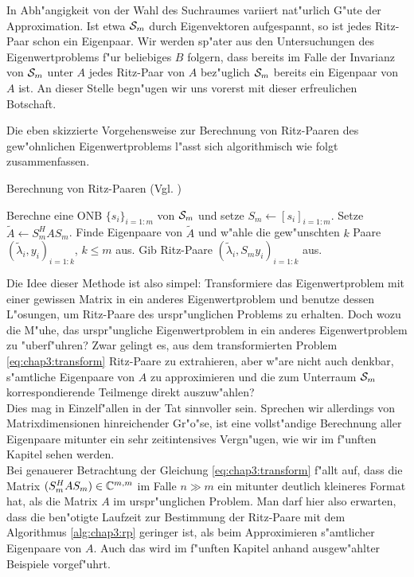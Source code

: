 In Abh"angigkeit von der Wahl
des Suchraumes variiert nat"urlich G"ute der Approximation. Ist etwa $\S_m$
durch Eigenvektoren aufgespannt, so ist jedes Ritz-Paar schon ein Eigenpaar.
Wir werden sp"ater aus den Untersuchungen des Eigenwertproblems f"ur beliebiges $B$ folgern,
dass bereits im Falle der Invarianz von $\S_m$ unter $A$ jedes Ritz-Paar von $A$ bez"uglich $\S_m$ bereits ein Eigenpaar von $A$ ist.
An dieser Stelle begn"ugen wir uns vorerst mit dieser erfreulichen Botschaft.

\newpage

Die eben skizzierte Vorgehensweise zur Berechnung von Ritz-Paaren des gew"ohnlichen Eigenwertproblems
l"asst sich algorithmisch wie folgt zusammenfassen.

\begin{algorithm}
\caption{Berechnung von Ritz-Paaren (Vgl. \cite[Algorithmus 4.5, S. 98]{saad})}\label{alg:chap3:rp}
\begin{algorithmic}[1]
\State Berechne eine ONB $\{s_i\}_{i=1:m}$ von $\S_m$ und setze $S_m\gets[s_i]_{i=1:m}$.
\State Setze $\widetilde{A}\gets S_m^H A S_m$.
\State Finde Eigenpaare von $\widetilde{A}$ und w"ahle die gew"unschten $k$ Paare $(\widetilde{\lambda}_i, y_i)_{i=1:k}$, $k\le m$ aus.
\State Gib Ritz-Paare $(\widetilde{\lambda}_i, S_m y_i)_{i=1:k}$ aus.
\end{algorithmic}
\end{algorithm}

Die Idee dieser Methode ist also simpel: Transformiere das Eigenwertproblem mit
einer gewissen Matrix in ein anderes Eigenwertproblem und benutze dessen L"osungen,
um Ritz-Paare des urspr"unglichen Problems zu erhalten.
Doch wozu die M"uhe, das urspr"ungliche Eigenwertproblem in ein anderes
Eigenwertproblem zu "uberf"uhren? Zwar gelingt es, aus dem transformierten Problem
\eqref{eq:chap3:transform} Ritz-Paare zu extrahieren, aber w"are nicht auch denkbar,
s"amtliche Eigenpaare von $A$ zu approximieren und die zum Unterraum $\S_m$
korrespondierende Teilmenge direkt auszuw"ahlen?\\

Dies mag in Einzelf"allen in der Tat sinnvoller sein. Sprechen wir allerdings
von Matrixdimensionen hinreichender Gr"o"se, ist eine vollst"andige
Berechnung aller Eigenpaare mitunter ein sehr zeitintensives Vergn"ugen, wie wir im f"unften Kapitel sehen werden.\\

Bei
genauerer Betrachtung der Gleichung \eqref{eq:chap3:transform} f"allt auf, dass die
Matrix $(S_m^H A S_m) \in \C^{m,m}$ im Falle $n \gg m$ ein mitunter deutlich kleineres
Format hat, als die Matrix $A$ im urspr"unglichen Problem. Man darf hier also erwarten,
dass die ben"otigte Laufzeit zur Bestimmung der Ritz-Paare mit dem Algorithmus \ref{alg:chap3:rp}
geringer ist, als beim Approximieren s"amtlicher Eigenpaare von $A$. Auch das
wird im f"unften Kapitel anhand ausgew"ahlter Beispiele vorgef"uhrt.\\

